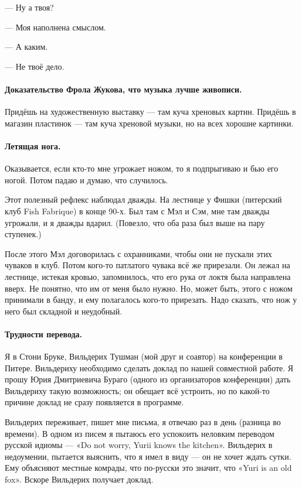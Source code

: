 \documentclass{book}
\begin{document}
--- Ну а твоя?

--- Моя наполнена смыслом.

--- А каким.

--- Не твоё дело.

\paragraph{Доказательство Фрола Жукова, что музыка лучше живописи.}
Придёшь на художественную выставку --- там куча хреновых картин.
Придёшь в магазин пластинок --- там куча хреновой музыки, но на всех хорошие картинки.

\paragraph{Летящая нога.}
Оказывается, если кто-то мне угрожает ножом, то я подпрыгиваю и бью его ногой.
Потом падаю и думаю, что случилось.

Этот полезный рефлекс наблюдал дважды.
На лестнице у Фишки (питерский клуб Fish Fabrique) в конце 90-х.
Был там с Мэл и Сэм, мне там дважды угрожали, и я дважды вдарил.
(Повезло, что оба раза был выше на пару ступенек.)

После этого Мэл договорилась с охранниками, чтобы они не пускали этих чуваков в клуб.
Потом кого-то патлатого чувака всё же прирезали.
Он лежал на лестнице, истекая кровью, запомнилось, что его рука от локтя была направлена вверх.
Не понятно, что им от меня было нужно.
Но, может быть, этого с ножом принимали в банду, и ему полагалось кого-то прирезать.
Надо сказать, что нож у него был складной и неудобный.

\paragraph{Трудности перевода.}
Я в Стони Бруке, Вильдерих Тушман (мой друг и соавтор) на конференции в Питере.
Вильдериху необходимо сделать доклад по нашей совместной работе.
Я прошу Юрия Дмитриевича Бураго (одного из организаторов конференции) дать Вильдериху такую возможность;
он обещает всё устроить, но по какой-то причине доклад не сразу появляется в программе.

Вильдерих переживает, пишет мне письма, я отвечаю раз в день (разница во времени).
В одном из писем я пытаюсь его успокоить неловким переводом русской идиомы --- «Do not worry, Yurii knows the kitchen».
Вильдерих в недоумении, пытается выяснить, что я имел в виду --- он не хочет ждать сутки.
Ему объясняют местные комрады, что по-русски это значит, что «Yuri is an old fox».
Вскоре Вильдерих получает доклад.
\end{document}
